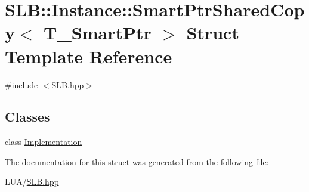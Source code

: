 \hypertarget{structSLB_1_1Instance_1_1SmartPtrSharedCopy}{}\section{S\+LB\+:\+:Instance\+:\+:Smart\+Ptr\+Shared\+Copy$<$ T\+\_\+\+Smart\+Ptr $>$ Struct Template Reference}
\label{structSLB_1_1Instance_1_1SmartPtrSharedCopy}


{\ttfamily \#include $<$S\+L\+B.\+hpp$>$}

\subsection*{Classes}
\begin{DoxyCompactItemize}
\item 
class \hyperlink{classSLB_1_1Instance_1_1SmartPtrSharedCopy_1_1Implementation}{Implementation}
\end{DoxyCompactItemize}


The documentation for this struct was generated from the following file\+:\begin{DoxyCompactItemize}
\item 
L\+U\+A/\hyperlink{SLB_8hpp}{S\+L\+B.\+hpp}\end{DoxyCompactItemize}
